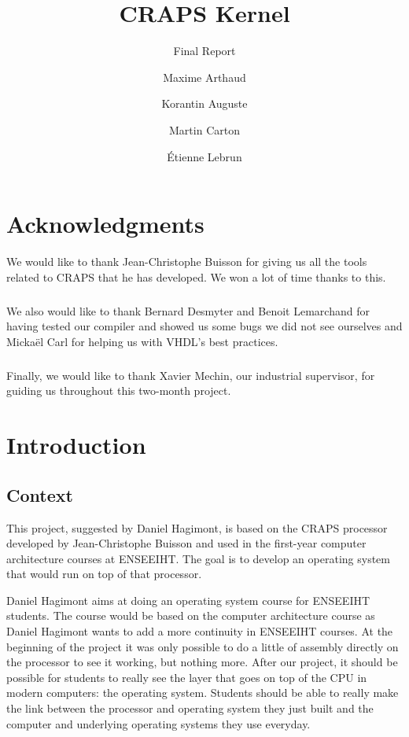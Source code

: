 \documentclass[openany, a4paper]{book}
\title{CRAPS Kernel}
\subtitle{Final Report}
\author{
       Maxime Arthaud
  \and Korantin Auguste
  \and Martin Carton
  \and Étienne Lebrun
}
\begin{document}
  

  \chapter*{Acknowledgments}
    We would like to thank Jean-Christophe Buisson for giving us all the tools
    related to CRAPS that he has developed. We won a lot of time thanks to this.

    \paragraph{}
    We also would like to thank Bernard Desmyter and Benoit Lemarchand for
    having tested our compiler and showed us some bugs we did not see ourselves
    and Mickaël Carl for helping us with VHDL's best practices.

    \paragraph{}
    Finally, we would like to thank Xavier Mechin, our industrial supervisor,
    for guiding us throughout this two-month project.

  \tableofcontents

  \chapter{Introduction}
    \section{Context}
      This project, suggested by Daniel Hagimont, is based on the CRAPS
      processor developed by Jean-Christophe Buisson and used in the first-year
      computer architecture courses at ENSEEIHT. The goal is to develop an
      operating system that would run on top of that processor.

      Daniel Hagimont aims at doing an operating system course for ENSEEIHT
      students. The course would be based on the computer architecture course as
      Daniel Hagimont wants to add a more continuity in ENSEEIHT courses. At the
      beginning of the project it was only possible to do a little of assembly
      directly on the processor to see it working, but nothing more.
      After our project, it should be possible for students to really see
      the layer that goes on top of the CPU in modern computers: the operating
      system. Students should be able to really make the link between the
      processor and operating system they just built and the computer and
      underlying operating systems they use everyday.
\end{document}
